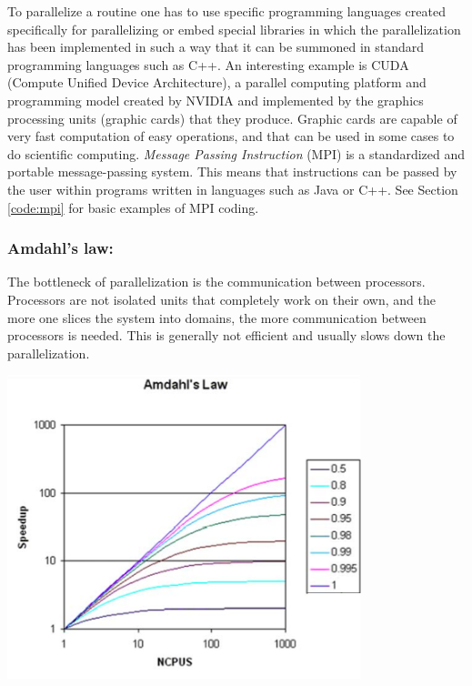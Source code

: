 To parallelize a routine one has to use specific programming languages created specifically for parallelizing or embed special libraries in which the parallelization has been implemented in such a way that it can be summoned in standard programming languages such as C++. An interesting example is CUDA (Compute Unified Device Architecture), a parallel computing platform and programming model created by NVIDIA and implemented by the graphics processing units (graphic cards) that they produce. Graphic cards are capable of very fast computation of easy operations, and that can be used in some cases to do scientific computing. \emph{Message Passing Instruction} (MPI) is a standardized and portable message-passing system. This means that instructions can be passed by the user within programs written in languages such as Java or C++. See Section \ref{code:mpi} for basic examples of MPI coding.



\subsubsection*{Amdahl's law:}

The bottleneck of parallelization is the communication between processors. Processors are not isolated units that completely work on their own, and the more one slices the system into domains, the more communication between processors is needed. This is generally not efficient and usually slows down the parallelization.


\vspace{0.1cm}
\noindent
\noindent\begin{minipage}{\textwidth}
\begin{minipage}{.98\textwidth}
  \centering
  \includegraphics[height=250pt]{pics/amdahl}
  \label{fig:amdahl}
\end{minipage}
\end{minipage}
\vspace{0.1cm}











